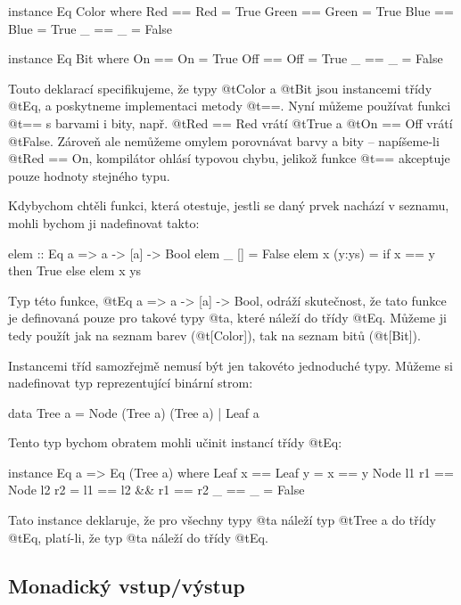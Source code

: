 \begin{haskell}
instance Eq Color where
  Red   == Red   = True
  Green == Green = True
  Blue  == Blue  = True
  _     == _     = False

instance Eq Bit where
  On  == On  = True
  Off == Off = True
  _   == _   = False
\end{haskell}

Touto deklarací specifikujeme, že typy @t{Color} a @t{Bit} jsou instancemi
třídy @t{Eq}, a poskytneme implementaci metody @t{==}. Nyní můžeme používat
funkci @t{==} s barvami i bity, např. @t{Red == Red} vrátí @t{True} a @t{On ==
Off} vrátí @t{False}. Zároveň ale nemůžeme omylem porovnávat barvy a bity --
napíšeme-li @t{Red == On}, kompilátor ohlásí typovou chybu, jelikož funkce
@t{==} akceptuje pouze hodnoty stejného typu.

Kdybychom chtěli funkci, která otestuje, jestli se daný prvek nachází v
seznamu, mohli bychom ji nadefinovat takto:

\begin{haskell}
elem :: Eq a => a -> [a] -> Bool
elem _ [] = False
elem x (y:ys) = if x == y then True else elem x ys
\end{haskell}

Typ této funkce, @t{Eq a => a -> [a] -> Bool}, odráží skutečnost, že tato funkce
je definovaná pouze pro takové typy @t{a}, které náleží do třídy @t{Eq}. Můžeme
ji tedy použít jak na seznam barev (@t{[Color]}), tak na seznam bitů
(@t{[Bit]}).

Instancemi tříd samozřejmě nemusí být jen takovéto jednoduché typy.  Můžeme si
nadefinovat typ reprezentující binární strom:

\begin{haskell}
data Tree a = Node (Tree a) (Tree a) | Leaf a
\end{haskell}

Tento typ bychom obratem mohli učinit instancí třídy @t{Eq}:

\begin{haskell}
instance Eq a => Eq (Tree a) where
  Leaf x == Leaf y         = x == y
  Node l1 r1 == Node l2 r2 = l1 == l2 && r1 == r2
  _ == _ = False
\end{haskell}

Tato instance deklaruje, že pro všechny typy @t{a} náleží typ @t{Tree a} do
třídy @t{Eq}, platí-li, že typ @t{a} náleží do třídy @t{Eq}.

\subsection{Monadický vstup/výstup}
\label{subsec:intro-monad}

